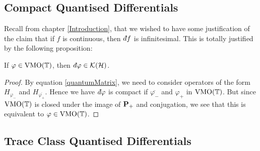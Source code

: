\subsection{Compact Quantised Differentials}
Recall from chapter \ref{Introduction}, that we wished to have some justification
of the claim that if $f$ is continuous, then $\qd f$ is infinitesimal. This is totally
justified by the following proposition:
\begin{proposition}
\label{compactDifferentials}
    If $\varphi \in \operatorname{VMO}(\mathbb{T})$, then $\qd \varphi \in \mathcal{K}(\Hilb)$.
\end{proposition}
\begin{proof}
    By equation \ref{quantumMatrix}, we need to consider operators of the form $H_{\varphi_-}$
    and $H_{\overline{\varphi_+}}$. Hence we have $\qd \varphi$ is compact
    if $\overline{\varphi_-}$ and $\varphi_+$ in $\operatorname{VMO}(\mathbb{T})$. But 
    since $\operatorname{VMO}(\mathbb{T})$ is closed under the image of $\mathbf{P}_+$ and conjugation,
    we see that this is equivalent to $\varphi \in \operatorname{VMO}(\mathbb{T})$. 
\end{proof}


\subsection{Trace Class Quantised Differentials}


